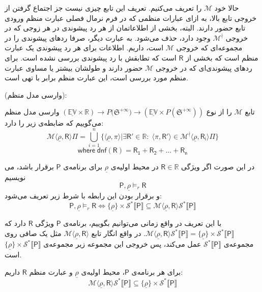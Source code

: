 حالا خود $\mathcal{M}$ را تعریف می‌کنیم. تعریف این تابع چیزی نیست جز اجتماع گرفتن از خروجی تابع بالا، به ازای عبارات منظمی که در فرم نرمال فصلی عبارت منظم ورودی تابع حضور دارند. البته، بخشی از اطلاعاتمان از هر رد پیشوندی در هر زوجی که در خروجی $\mathcal{M}^\nmid$ وجود دارد، حذف می‌شود. به عبارت دیگر، صرفا ردهای پیشوندی را در مجموعه‌ای که خروجی $\mathcal{M}$ است، داریم. اطلاعات برای هر رد پیشوندی یک عبارت منظم است که بخشی از $\mathsf{R}$ است که تطابقش با رد پیشوندی بررسی نشده است. برای ردهای پیشوندی‌ای که در خروجی $\mathcal{M}$ حضور دارند و طولشان بیشتر یا مساوی عبارت منظم مورد بررسی است، این عبارت منظم برابر با تهی است.

\begin{defn}
(وارسی مدل منظم):

تابع $\mathcal{M}$ را از نوع 
$\mathbb{(\underline{EV} \times R)} \rightarrow  \mathit{P}({\mathfrak{S}^{+\infty})}
\rightarrow (\mathbb{\underline{EV}} \times \mathit{P} (\mathfrak{S}^{+\infty} ) )$
 وارسی مدل منظم می‌گوییم که ضابطه‌ی زیر را دارد:
$$\mathcal{M} \langle \underline{\rho} , \mathsf{R} \rangle \Pi= \bigcup_{i=1}^n \{  \langle \underline{\rho},\pi\rangle | \exists \mathsf{R'} \in \mathbb{R}:\; \langle \pi , \mathsf{R'} \rangle \in 
\mathcal{M}^\nmid \langle \underline{\rho}, \mathsf{R_i} \rangle \Pi \}$$
$$\mathsf{where \; dnf (R) = R_1 + R_2 + ... + R_n}$$ 



در این صورت اگر ویژگی $\mathsf{R} \in \mathbb{R}$ در محیط اولیه‌ی $\underline{\rho}$ برای برنامه‌ی $\mathsf{P}$ برقرار باشد، می نویسیم
$$\mathsf{P} , \underline{\rho} \models_r \mathsf{R}$$
و برقرار بودن این رابطه با شرط زیر تعریف می‌شود:
$$\mathsf{P} , \underline{\rho} \models_r \mathsf{R} \iff \{\underline{\rho}\} \times \mathcal{S}^* \llbracket \mathsf{P} \rrbracket \subseteq \mathcal{M} \langle \underline{\rho} , \mathsf{R} \rangle \mathcal{S}^* \llbracket \mathsf{P} \rrbracket$$

\end{defn}

با این تعریف در واقع زمانی می‌توانیم بگوییم، برنامه‌ی $\mathsf{P}$ ویژگی $\mathsf{R}$ دارد \break که 
$\mathcal{M}\langle \underline{\rho} , \mathsf{R} \rangle \mathcal{S}^* \llbracket \mathsf{P} \rrbracket = 
\{\underline{\rho}\} \times \mathcal{S}^* \llbracket \mathsf{P} \rrbracket$.
در واقع انگار تابع 
$\mathcal{M} \langle \underline{\rho} , \mathsf{R} \rangle$
مثل یک صافی روی مجموعه‌ی 
$\mathcal{S}^* \llbracket \mathsf{P} \rrbracket$
عمل می‌کند، پس خروجی این مجموعه زیر مجموعه‌ی $\{\underline{\rho}\} \times \mathcal{S}^* \llbracket \mathsf{P} \rrbracket$ است.
\begin{thm}
	برای هر برنامه‌ی $\mathsf{P}$، محیط اولیه‌ی $\underline{\rho}$ و عبارت منظم $\mathsf{R}$ داریم:
	$$\mathcal{M}\langle \underline{\rho},\mathsf{R} \rangle \mathcal{S}^* \llbracket \mathsf{P} \rrbracket \subseteq \{\underline{\rho}\} \times \mathcal{S}^* \llbracket \mathsf{P}\rrbracket$$
\end{thm}

